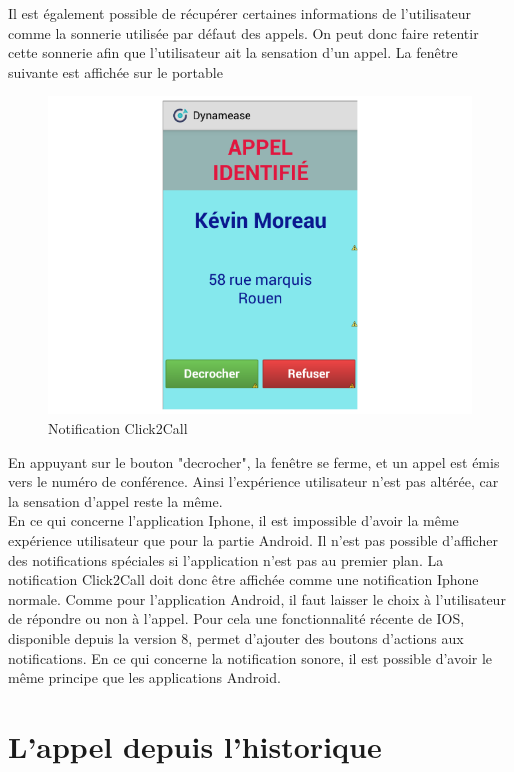 Il est également possible de récupérer certaines informations de l'utilisateur comme la sonnerie utilisée par défaut des appels. On peut donc faire retentir cette sonnerie afin que l'utilisateur ait la sensation d'un appel. La fenêtre suivante est affichée sur le portable
\newpage
\begin{figure}[!h]
	\centering
	\includegraphics[scale=0.7]{img/click2call.png}
	\caption{\label{notification_click2call}Notification Click2Call}
\end{figure}


En appuyant sur le bouton "decrocher", la fenêtre se ferme, et un appel est émis vers le numéro de conférence. Ainsi l'expérience utilisateur n'est pas altérée, car la sensation d'appel reste la même.\\

En ce qui concerne l'application Iphone, il est impossible d'avoir la même expérience utilisateur que pour la partie Android. Il n'est pas possible d'afficher des notifications spéciales si l'application n'est pas au premier plan. La notification Click2Call doit donc être affichée comme une notification Iphone normale. Comme pour l'application Android, il faut laisser le choix à l'utilisateur de répondre ou non à l'appel. Pour cela une fonctionnalité récente de IOS, disponible depuis la version 8, permet d'ajouter des boutons d'actions aux notifications. En ce qui concerne la notification sonore, il est possible d'avoir le même principe que les applications Android.


\section{L'appel depuis l'historique}

